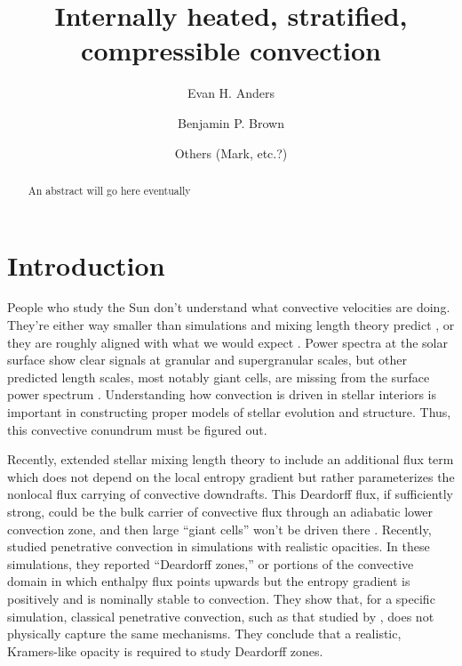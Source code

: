\documentclass[titlepage, twocolumn, fontsize=10]{aastex6}
\begin{document}
\title{Internally heated, stratified, compressible convection}

\author{Evan H. Anders}
\author{Benjamin P. Brown}
\author{Others (Mark, etc.?)}

\begin{abstract}
An abstract will go here eventually
\end{abstract}



\section{Introduction}
\label{sec:intro}
People who study the Sun don't understand what convective velocities are doing.
They're either way smaller than simulations and mixing length theory predict
\citep{hanasoge&all2012}, or they are roughly aligned with what we would
expect \citep{greer&all2015L}.  Power spectra at the solar surface show clear signals at
granular and supergranular scales, but other predicted length scales, most notably
giant cells, are missing from the surface power spectrum \citep{hathaway&all2015}.
Understanding how convection is driven in
stellar interiors is important in constructing proper models of stellar evolution
and structure.  Thus, this convective conundrum must be figured out.

Recently, \cite{brandenburg2016} extended stellar mixing length theory to include
an additional flux term which does not depend on the local entropy gradient but
rather parameterizes the nonlocal flux carrying of convective downdrafts.  This
Deardorff flux, if sufficiently strong, could be the bulk carrier of convective
flux through an adiabatic lower convection zone, and then large ``giant cells'' won't be
driven there \cite{lord&all2014}.  Recently, \cite{kapyla&all2017} studied penetrative
convection in simulations with realistic opacities.  In these simulations, they reported
``Deardorff zones,'' or portions of the convective domain in which enthalpy flux points
upwards but the entropy gradient is positively and is nominally stable to convection.
They show that, for a specific simulation, classical penetrative convection,
such as that studied by \cite{hurlburt&all1986}, does not physically capture the
same mechanisms.  They conclude that a realistic, Kramers-like opacity
is required to study Deardorff zones.
\end{document}
